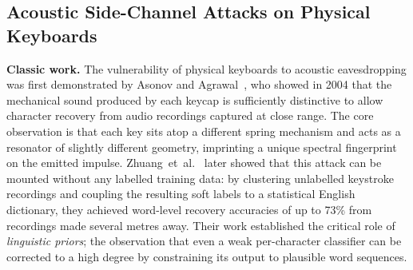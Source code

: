 \documentclass[conference]{IEEEtran}
\begin{document}
\subsection{Acoustic Side-Channel Attacks on Physical Keyboards}

\textbf{Classic work.}
The vulnerability of physical keyboards to acoustic eavesdropping was first demonstrated by Asonov and Agrawal~\cite{asonov2004}, who showed in 2004 that the mechanical sound produced by each keycap is
sufficiently distinctive to allow character recovery from audio
recordings captured at close range.
The core observation is that each key sits atop a different spring
mechanism and acts as a resonator of slightly different geometry,
imprinting a unique spectral fingerprint on the emitted impulse.
Zhuang~et~al.~\cite{zhuang2005} later showed that this attack can be
mounted without any labelled training data: by clustering unlabelled keystroke recordings and coupling the resulting soft labels to a statistical English dictionary, they achieved word-level recovery accuracies of up to 73\% from recordings made several metres away. Their work established the critical role of \emph{linguistic
priors}; the observation that even a weak per-character classifier
can be corrected to a high degree by constraining its output to
plausible word sequences.
\end{document}
